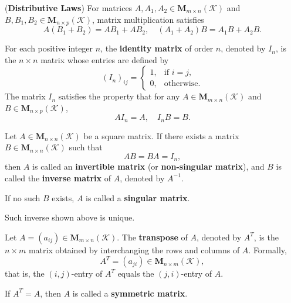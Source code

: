 \documentclass{ctexart}
\begin{document}
	\begin{mythm}
		(\textbf{Distributive Laws})  
		For matrices $A, A_1, A_2 \in \mathbf{M}_{m \times n}(\mathcal{K})$ 
		and $B, B_1, B_2 \in \mathbf{M}_{n \times p}(\mathcal{K})$,  
		matrix multiplication satisfies
		\[
		A(B_1 + B_2) = AB_1 + AB_2, 
		\quad (A_1 + A_2)B = A_1B + A_2B.
		\]
	\end{mythm}
	
	\begin{mydef}
		For each positive integer $n$, the \textbf{identity matrix} of order $n$, denoted by $I_n$,  
		is the $n \times n$ matrix whose entries are defined by
		\[
		(I_n)_{ij} =
		\begin{cases}
			1, & \text{if } i = j,\\
			0, & \text{otherwise}.
		\end{cases}
		\]
		The matrix $I_n$ satisfies the property that for any 
		$A \in \mathbf{M}_{m \times n}(\mathcal{K})$ and 
		$B \in \mathbf{M}_{n \times p}(\mathcal{K})$,
		\[
		AI_n = A, \quad I_nB = B.
		\]
	\end{mydef}
	
	\begin{mydef}
		Let $A \in \mathbf{M}_{n \times n}(\mathcal{K})$ be a square matrix.  
		If there exists a matrix $B \in \mathbf{M}_{n \times n}(\mathcal{K})$ such that
		\[
		AB = BA = I_n,
		\]
		then $A$ is called an \textbf{invertible matrix} (or \textbf{non-singular matrix}),  
		and $B$ is called the \textbf{inverse matrix} of $A$, denoted by $A^{-1}$.
		
		If no such $B$ exists, $A$ is called a \textbf{singular matrix}.
	\end{mydef}
	
	\begin{myrmk}
		Such inverse shown above is unique.
	\end{myrmk}
	
	\begin{mydef}
		Let $A = (a_{ij}) \in \mathbf{M}_{m \times n}(\mathcal{K})$.  
		The \textbf{transpose} of $A$, denoted by $A^{T}$, is the $n \times m$ matrix obtained by interchanging the rows and columns of $A$.  
		Formally,
		\[
		A^{T} = (a_{ji}) \in \mathbf{M}_{n \times m}(\mathcal{K}),
		\]
		that is, the $(i,j)$-entry of $A^{T}$ equals the $(j,i)$-entry of $A$.
		
		If $A^{T} = A$, then $A$ is called a \textbf{symmetric matrix}.
	\end{mydef}
	
\end{document}
